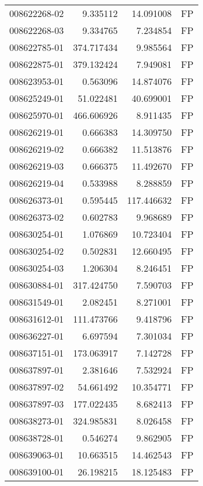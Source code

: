 \begin{tabular}{lrrl}
008622268-02 &    9.335112 &      14.091008 &   FP \\
008622268-03 &    9.334765 &       7.234854 &   FP \\
008622785-01 &  374.717434 &       9.985564 &   FP \\
008622875-01 &  379.132424 &       7.949081 &   FP \\
008623953-01 &    0.563096 &      14.874076 &   FP \\
008625249-01 &   51.022481 &      40.699001 &   FP \\
008625970-01 &  466.606926 &       8.911435 &   FP \\
008626219-01 &    0.666383 &      14.309750 &   FP \\
008626219-02 &    0.666382 &      11.513876 &   FP \\
008626219-03 &    0.666375 &      11.492670 &   FP \\
008626219-04 &    0.533988 &       8.288859 &   FP \\
008626373-01 &    0.595445 &     117.446632 &   FP \\
008626373-02 &    0.602783 &       9.968689 &   FP \\
008630254-01 &    1.076869 &      10.723404 &   FP \\
008630254-02 &    0.502831 &      12.660495 &   FP \\
008630254-03 &    1.206304 &       8.246451 &   FP \\
008630884-01 &  317.424750 &       7.590703 &   FP \\
008631549-01 &    2.082451 &       8.271001 &   FP \\
008631612-01 &  111.473766 &       9.418796 &   FP \\
008636227-01 &    6.697594 &       7.301034 &   FP \\
008637151-01 &  173.063917 &       7.142728 &   FP \\
008637897-01 &    2.381646 &       7.532924 &   FP \\
008637897-02 &   54.661492 &      10.354771 &   FP \\
008637897-03 &  177.022435 &       8.682413 &   FP \\
008638273-01 &  324.985831 &       8.026458 &   FP \\
008638728-01 &    0.546274 &       9.862905 &   FP \\
008639063-01 &   10.663515 &      14.462543 &   FP \\
008639100-01 &   26.198215 &      18.125483 &   FP \\

\end{tabular}
